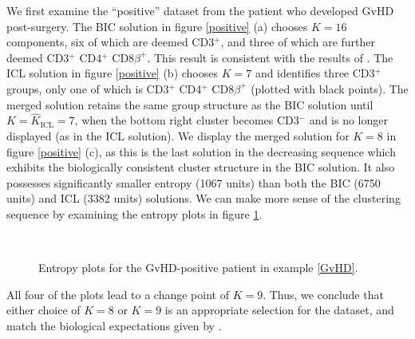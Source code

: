 \documentclass{uwstat572}
\newcommand*\estim[1]{\widehat{#1}}
\renewcommand\;{\,}
\begin{document}
We first examine the ``positive'' dataset from the patient who developed GvHD post-surgery.
The BIC solution in figure \ref{positive} (a) chooses $K = 16$ components, six of which are deemed CD3$^+$, and three of which are further deemed CD3$^+$ CD4$^+$ CD8$\beta^+$.
This result is consistent with the results of \cite{Brinkman07}.
The ICL solution in figure \ref{positive} (b) chooses $K = 7$ and identifies three CD3$^+$ groups, only one of which is CD3$^+$ CD4$^+$ CD8$\beta^+$ (plotted with black points).
The merged solution retains the same group structure as the BIC solution until $K = \estim K_\text{ICL} = 7$, when the bottom right cluster becomes CD3$^-$ and is no longer displayed (as in the ICL solution).
We display the merged solution for $K = 8$ in figure \ref{positive} (c), as this is the last solution in the decreasing sequence which exhibits the biologically consistent cluster structure in the BIC solution.
It also possesses significantly smaller entropy (1067 units) than both the BIC (6750 units) and ICL (3382 units) solutions.
We can make more sense of the clustering sequence by examining the entropy plots in figure \ref{Entropy5_1}.
\begin{figure}
\begin{center}
\\
\end{center}
\caption{Entropy plots for the GvHD-positive patient in example \ref{GvHD}.}
\label{Entropy5_1}
\end{figure}
All four of the plots lead to a change point of $K = 9$.
Thus, we conclude that either choice of $K = 8$ or $K = 9$ is an appropriate selection for the dataset, and match the biological expectations given by \cite{Brinkman07}.
\end{document}
